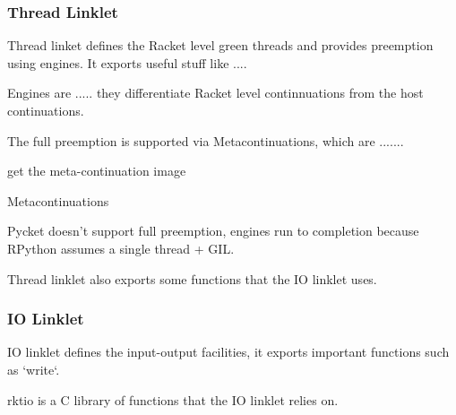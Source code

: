 			\subsubsection{Thread Linklet}

				\begin{paragraph-here}%
					Thread linket defines the Racket level green threads and provides preemption using engines. It exports useful stuff like ....
				\end{paragraph-here}

				\begin{paragraph-here}%
					Engines are ..... they differentiate Racket level continnuations from the host continuations.
				\end{paragraph-here}

				\begin{paragraph-here}%
					The full preemption is supported via Metacontinuations, which are .......
				\end{paragraph-here}

				\begin{figure-here}
					get the meta-continuation image

					\begin{todo}
						Metacontinuations
					\end{todo}
				\end{figure-here}

				\begin{paragraph-here}%
					Pycket doesn't support full preemption, engines run to completion because RPython assumes a single thread + GIL.
				\end{paragraph-here}

				\begin{paragraph-here}%
					Thread linklet also exports some functions that the IO linklet uses.
				\end{paragraph-here}

			\subsubsection{IO Linklet}

				\begin{paragraph-here}%
					IO linklet defines the input-output facilities, it exports important functions such as `write`.
				\end{paragraph-here}

				\begin{paragraph-here}%
					rktio is a C library of functions that the IO linklet relies on.
				\end{paragraph-here}

